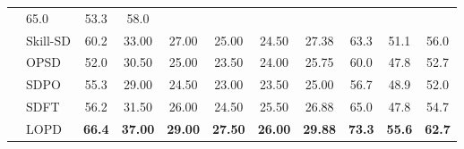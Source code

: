 \documentclass{article} %
\newcommand{\ourmethod}{{\textsc{LOPD}}\xspace}
\newcommand{\bestcell}[1]{\cellcolor{bestgreen}\textbf{#1}}
\newcommand{\secondcell}[1]{\cellcolor{secondgreen}#1}
\begin{document}
\begin{table}[!t]
{\begin{tabular}{
ll@{\hspace{0.55em}}
c@{\hspace{0.65em}}
ccccc@{\hspace{0.65em}}
ccc
}
& \secondcell{65.0} & \secondcell{53.3} & \secondcell{58.0} \\
& Skill-SD
& \secondcell{60.2}
& 33.00 & 27.00 & 25.00 & 24.50 & 27.38
& 63.3 & 51.1 & 56.0 \\
& OPSD
& 52.0
& 30.50 & 25.00 & 23.50 & 24.00 & 25.75
& 60.0 & 47.8 & 52.7 \\
& SDPO
& 55.3
& 29.00 & 24.50 & 23.00 & 23.50 & 25.00
& 56.7 & 48.9 & 52.0 \\
& SDFT
& 56.2
& 31.50 & 26.00 & 24.50 & \secondcell{25.50} & 26.88
& \secondcell{65.0} & 47.8 & 54.7 \\
& \ourmethod
& \bestcell{66.4}
& \bestcell{37.00} & \bestcell{29.00} & \bestcell{27.50} & \bestcell{26.00} & \bestcell{29.88}
& \bestcell{73.3} & \bestcell{55.6} & \bestcell{62.7} \\
\bottomrule
\end{tabular}
}
\vspace{-0.4em}
\end{table}
\end{document}
